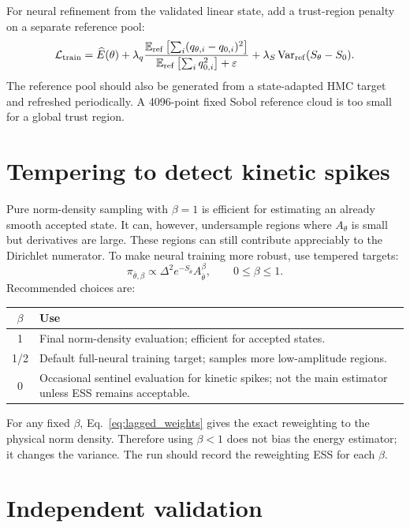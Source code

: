 \documentclass[11pt]{article}
\newcommand{\E}{\mathbb{E}}
\newcommand{\Var}{\operatorname{Var}}
\newcommand{\D}{\Delta}
\newcommand{\veps}{\varepsilon}
\begin{document}
For neural refinement from the validated linear state, add a trust-region penalty on a separate reference pool:
\begin{equation}
 \mathcal L_{\rm train}=\widehat E(\theta)
 +\lambda_q\frac{\E_{\rm ref}\left[\sum_i(q_{\theta,i}-q_{0,i})^2\right]}{\E_{\rm ref}\left[\sum_iq_{0,i}^2\right]+\veps}
 +\lambda_S\Var_{\rm ref}(S_\theta-S_0).
\end{equation}
The reference pool should also be generated from a state-adapted HMC target and refreshed periodically.  A 4096-point fixed Sobol reference cloud is too small for a global trust region.

\section{Tempering to detect kinetic spikes}

Pure norm-density sampling with $\beta=1$ is efficient for estimating an already smooth accepted state.  It can, however, undersample regions where $A_\theta$ is small but derivatives are large.  These regions can still contribute appreciably to the Dirichlet numerator.  To make neural training more robust, use tempered targets:
\begin{equation}
 \pi_{\bar\theta,\beta}\propto\D^2e^{-S_{\bar\theta}}A_{\bar\theta}^{\beta},
 \qquad 0\le\beta\le1.
\end{equation}
Recommended choices are:
\begin{center}
\begin{tabular}{cl}
\toprule
$\beta$ & Use \\
\midrule
1 & Final norm-density evaluation; efficient for accepted states. \\
1/2 & Default full-neural training target; samples more low-amplitude regions. \\
0 & Occasional sentinel evaluation for kinetic spikes; not the main estimator unless ESS remains acceptable. \\
\bottomrule
\end{tabular}
\end{center}
For any fixed $\beta$, Eq.~\eqref{eq:lagged_weights} gives the exact reweighting to the physical norm density.  Therefore using $\beta<1$ does not bias the energy estimator; it changes the variance.  The run should record the reweighting ESS for each $\beta$.

\section{Independent validation}
\end{document}
